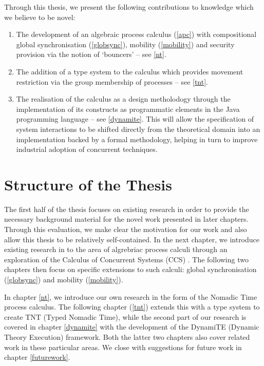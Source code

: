 Through this thesis, we present the following contributions to
knowledge which we believe to be novel:

\begin{enumerate}
\item The development of an algebraic process calculus (\ref{apc})
  with compositional global synchronisation (\ref{globsync}), mobility
  (\ref{mobility}) and security provision via the notion of `bouncers'
  -- see \ref{nt}.
\item The addition of a type system to the calculus which provides
  movement restriction via the group membership of processes -- see
  \ref{tnt}.
\item The realisation of the calculus as a design metholodogy through
  the implementation of its constructs as programmatic elements in the
  Java programming language -- see \ref{dynamite}.  This will allow
  the specification of system interactions to be shifted directly from
  the theoretical domain into an implementation backed by a formal
  methodology, helping in turn to improve industrial adoption of
  concurrent techniques.
\end{enumerate}

\section{Structure of the Thesis}

The first half of the thesis focuses on existing research in order to
provide the necessary background material for the novel work presented
in later chapters.  Through this evaluation, we make clear the
motivation for our work and also allow this thesis to be relatively
self-contained.  In the next chapter, we introduce existing research
in to the area of algrebriac process calculi through an exploration of
the Calculus of Concurrent Systems (CCS) \cite{milner:ccs}.  The
following two chapters then focus on specific extensions to such
calculi: global synchronisation (\ref{globsync}) and mobility
(\ref{mobility}).

In chapter \ref{nt}, we introduce our own research in the form of the
Nomadic Time process calculus.  The following chapter (\ref{tnt})
extends this with a type system to create TNT (Typed Nomadic Time),
while the second part of our research is covered in chapter
\ref{dynamite} with the development of the DynamiTE (Dynamic Theory
Execution) framework.  Both the latter two chapters also cover related
work in these particular areas.  We close with suggestions for future
work in chapter \ref{futurework}.
